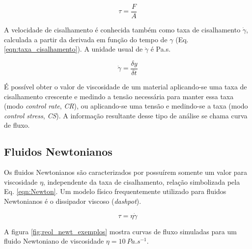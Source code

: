 			\begin{equation}
				\tau = \frac{F}{A}
				\label{eqn:tensao_cisalhamento}
			\end{equation}
			
			A velocidade de cisalhamento é conhecida também como taxa de cisalhamento \(\dot{\gamma}\), calculada a partir da derivada em função do tempo de \(\gamma\) (Eq. \ref{eqn:taxa_cisalhamento}). A unidade usual de \(\dot{\gamma}\) é Pa.s\menosUm.
			
			\begin{equation}
				\dot{\gamma} = \dfrac{\delta y}{\delta t}
				\label{eqn:taxa_cisalhamento}
			\end{equation}
			
			É possível obter o valor de viscosidade de um material aplicando-se uma taxa de cisalhamento crescente e medindo a tensão necessária para manter essa taxa (modo \emph{control rate}, \emph{CR}), ou aplicando-se uma tensão e medindo-se a taxa (modo \emph{control stress}, \emph{CS}). A informação resultante desse tipo de análise se chama curva de fluxo.
						
			\subsection{Fluidos Newtonianos}
			
			Os fluidos Newtonianos são caracterizados por possuírem somente um valor para viscosidade \(\eta\), independente da taxa de cisalhamento, relação simbolizada pela Eq. \ref{eqn:Newton}. Um modelo físico frequentemente utilizado para fluidos Newtonianos é o dissipador viscoso (\emph{dashpot}).
			
			\begin{equation}
				\tau = \eta\dot{\gamma}
				\label{eqn:Newton}
			\end{equation}
			
			A figura \ref{fig:reol_newt_exemplos} mostra curvas de fluxo simuladas para um fluido Newtoniano de viscosidade \(\eta=10\:Pa.s^{-1}\).
			
